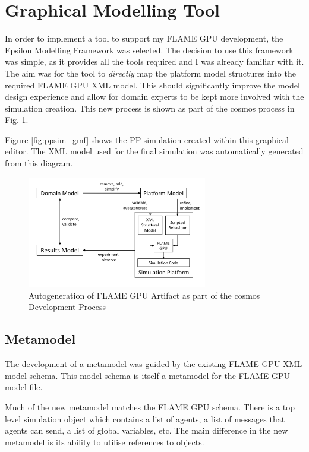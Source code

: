 \documentclass{UoYCSproject}
\begin{document}
\section{Graphical Modelling Tool}
In order to implement a tool to support my \gls{FLAME GPU} development, the Epsilon Modelling Framework was selected.
The decision to use this framework was simple, as it provides all the tools required and I was already familiar with it.
The aim was for the tool to \textit{directly} map the platform model structures into the required \gls{FLAME GPU} XML model.
This should significantly improve the model design experience and allow for domain experts to be kept more involved with the simulation creation.
This new process is shown as part of the \gls{cosmos} process in Fig. \ref{fig:flame_improved}.

Figure \ref{fig:ppsim_gmf} shows the \gls{PP} simulation created within this graphical editor.
The XML model used for the final simulation was automatically generated from this diagram.

\begin{figure}[htp]
\centering
\includegraphics[width=0.7\textwidth]{Appendix/CoSMoS_FLAME}
\caption{Autogeneration of \gls{FLAME GPU} Artifact as part of the \gls{cosmos} Development Process}
\label{fig:flame_improved}
\end{figure}

\subsection{Metamodel}
The development of a metamodel was guided by the existing \gls{FLAME GPU} XML model schema.
This model schema is itself a metamodel for the \gls{FLAME GPU} model file.

Much of the new metamodel matches the \gls{FLAME GPU} schema.
There is a top level simulation object which contains a list of agents, a list of messages that agents can send, a list of global variables, etc.
The main difference in the new metamodel is its ability to utilise references to objects.
\end{document}
